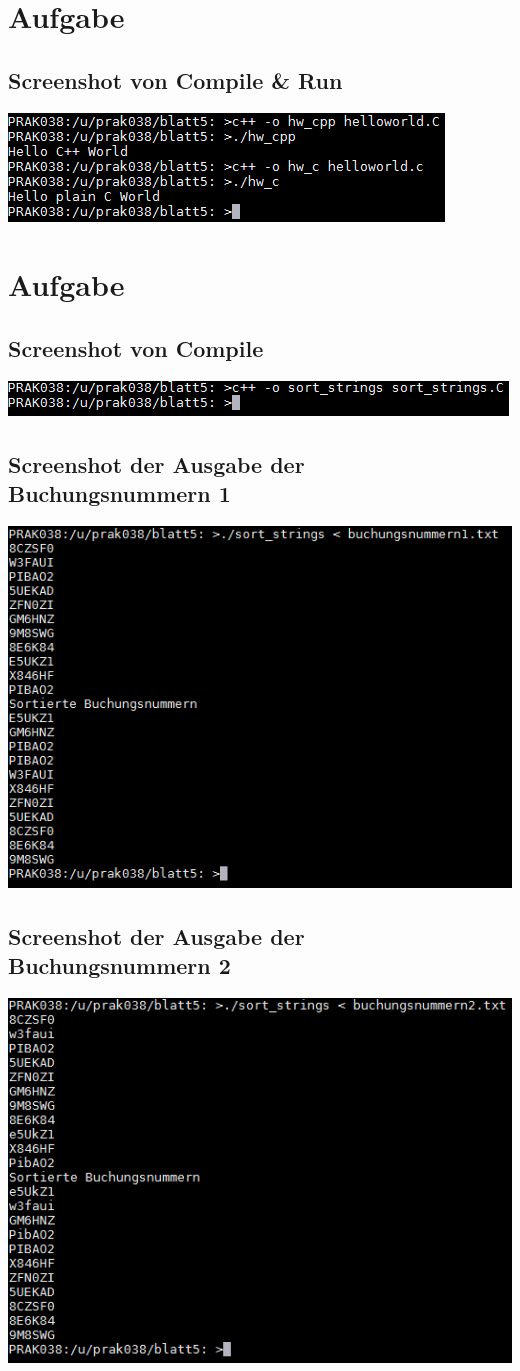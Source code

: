 \documentclass[a4paper]{scrartcl}
\begin{document}
	\section{Aufgabe}
	\subsection{Screenshot von Compile \& Run}
	\includegraphics{screenshots/helloworld_compile_and_run.png}
	\section{Aufgabe}
	\subsection{Screenshot von Compile}
	\includegraphics{screenshots/2_COMPILE.png}
	\subsection{Screenshot der Ausgabe der Buchungsnummern 1}
	\includegraphics{screenshots/2_RUN_1.png}
	\subsection{Screenshot der Ausgabe der Buchungsnummern 2}
	\includegraphics{screenshots/2_RUN_2.png}
\end{document}
